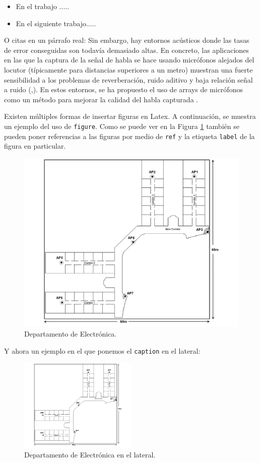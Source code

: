 \documentclass[spanish,openright]{book}
\begin{document}
\begin{itemize}
\item En el trabajo ..... 
\item En el siguiente trabajo.....
\end{itemize}

O citas en un párrafo real: Sin embargo, hay entornos acústicos donde
las tasas de error conseguidas son todavía demasiado altas. En concreto,
las aplicaciones en las que la captura de la señal de habla se hace
usando micrófonos alejados del locutor (típicamente para distancias
superiores a un metro) muestran una fuerte sensibilidad a los problemas
de reverberación, ruido aditivo y baja relación señal a ruido
(\cite{gelbart02},\cite{kochkin02}). En estos entornos, se ha propuesto
el uso de arrays de micrófonos como un método para mejorar la calidad
del habla capturada \cite{seltzer03}\cite{herbordt05}.

Existen múltiples formas de insertar figuras en Latex. A continuación,
se muestra un ejemplo del uso de \texttt{figure}. Como se puede ver en
la Figura \ref{fig1} también se pueden poner referencias a las figuras
por medio de \texttt{ref} y la etiqueta \texttt{label} de la figura en
particular.

\begin{figure}[h] \centering
  \includegraphics[width=4.7in]{Figure1}
\caption{Departamento de Electrónica.}
  \label{fig1}
\end{figure}

Y ahora un ejemplo en el que ponemos el \texttt{caption} en el lateral:

\begin{figure}
  \centering
  \includegraphics[width=0.5\textwidth]{Figure1}
  \caption{Departamento de Electrónica en el lateral.}
\end{figure}
\end{document}
